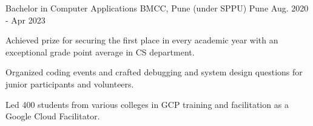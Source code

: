 

\begin{cventries}

  \cventry
    {Bachelor in Computer Applications} %
    {BMCC, Pune (under SPPU)} %
    {Pune} %
    {Aug. 2020 - Apr 2023} %
    {
      \begin{cvitems} %
        \item {Achieved prize for securing the first place in every academic year with an exceptional grade point average in CS department.}
        \item {Organized coding events and crafted debugging and system design questions for junior participants and volunteers.}
        \item{Led 400 students from various colleges in GCP training and facilitation as a Google Cloud Facilitator.}
      \end{cvitems}
    }

\end{cventries}
